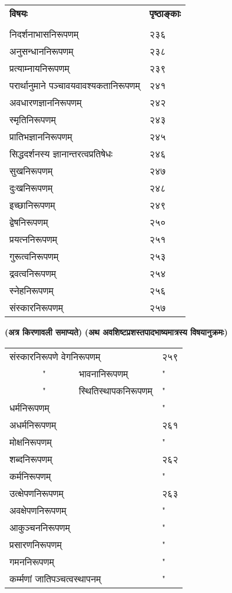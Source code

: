 \documentclass[11pt, openany]{book}
\begin{document}
\newpage
\noindent
\begin{tabular}{m{28em} m{2em}}
\textbf{विषयः} & \textbf{पृष्ठाङ्काः}\\
 & \\
निदर्शनाभासनिरूपणम् & २३६\\
अनुसन्धाननिरूपणम् & २३८\\
प्रत्याम्नायनिरूपणम् & २३९\\
परार्थानुमाने पञ्चावयवावश्यकतानिरूपणम् & २४१\\
अवधारणज्ञाननिरूपणम् & २४२\\
स्मृतिनिरूपणम् & २४३\\
प्रातिभज्ञाननिरूपणम् & २४५\\
सिद्धदर्शनस्य ज्ञानान्तरत्वप्रतिषेधः & २४६\\
सुखनिरूपणम् & २४७\\
दुःखनिरूपणम् & २४८\\
इच्छानिरूपणम् & २४९\\
द्वेषनिरूपणम् & २५०\\
प्रयत्ननिरूपणम् & २५१\\
गुरूत्वनिरूपणम् & २५३\\
द्रवत्वनिरूपणम् & २५४\\
स्नेहनिरूपणम् & २५६\\
संस्कारनिरूपणम् & २५७
\end{tabular}

\begin{center}
\textbf{(अत्र किरणावली समाप्यते)}
\textbf{\Large (अथ अवशिष्टप्रशस्तपादभाष्यमात्रस्य विषयानुक्रमः)}
\end{center}

\noindent
\begin{tabular}{m{28em} m{2em}}
संस्कारनिरूपणे वेगनिरूपणम् & २५९\\
~~~~~~~"~~~~~~~भावनानिरूपणम् & "\\
~~~~~~~"~~~~~~~स्थितिस्थापकनिरूपणम् & "\\
धर्मनिरूपणम् & "\\
अधर्मनिरूपणम् & २६१\\
मोक्षनिरूपणम् & "\\
शब्दनिरूपणम् & २६२\\
कर्मनिरूपणम् & "\\
उत्क्षेपणनिरूपणम् & २६३\\
अवक्षेपणनिरूपणम् & "\\
आकुञ्चननिरूपणम् & "\\
प्रसारणनिरूपणम् & "\\
गमननिरूपणम् & "\\
कर्म्मणां जातिपञ्चत्वस्थापनम् & "
\end{tabular}
\end{document}
